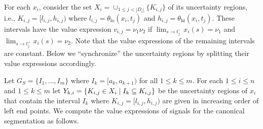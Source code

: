 For each $x_i$, consider the set $X_i = \cup_{1 \leq j < |D_i|} \{K_{i,j}\}$ of its uncertainty regions, i.e.,  $K_{i,j} = [l_{i,j}, h_{i,j})$ where $l_{i,j} = \theta_{\text{lo}}(x_i, t_j)$ and $h_{i,j} = \theta_{\text{hi}}(x_i, t_j)$.
These intervals have the value expression $v_{i,j} = \nu_1 \nu_2$ if $\lim_{s \to t_j^-} x_i(s) = \nu_1$ and $\lim_{s \to t_j^+} x_i(s) = \nu_2$.
Note that the value expressions of the remaining intervals are constant.
Below we ``synchronize'' the uncertainty regions by splitting their value expressions accordingly.

Let $G_S = \{I_1, \ldots, I_m\}$ where $I_k = [a_k, a_{k+1})$ for all $1 \leq k \leq m$.
For each $1 \leq i \leq n$ and $1 \leq k \leq m$ let $Y_{k,i} = \{ K_{i,j} \in X_i \st I_k \subseteq K_{i,j}\}$ be the uncertainty regions of $x_i$ that contain the interval $I_k$ where $K_{i,j} = [l_{i,j}, h_{i,j})$ are given in increasing order of left end points.
We compute the value expressions of signals for the canonical segmentation as follows. 
